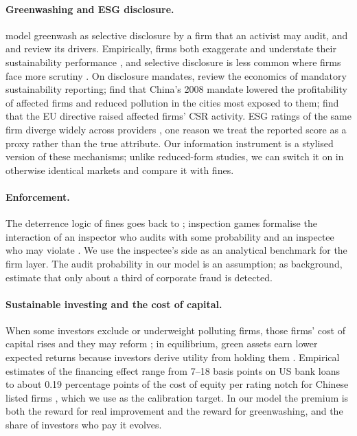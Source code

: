 \documentclass[11pt]{article}
\begin{document}
\paragraph{Greenwashing and ESG disclosure.} \citet{lyon2011greenwash} model greenwash as selective disclosure by a firm that an activist may audit, and \citet{delmas2011drivers} and \citet{lyon2015means} review its drivers. Empirically, firms both exaggerate and understate their sustainability performance \citep{kim2015greenwash}, and selective disclosure is less common where firms face more scrutiny \citep{marquis2016scrutiny}. On disclosure mandates, \citet{christensen2021mandatory} review the economics of mandatory sustainability reporting; \citet{chen2018effect} find that China's 2008 mandate lowered the profitability of affected firms and reduced pollution in the cities most exposed to them; \citet{fiechter2022real} find that the EU directive raised affected firms' CSR activity. ESG ratings of the same firm diverge widely across providers \citep{berg2022aggregate}, one reason we treat the reported score as a proxy rather than the true attribute. Our information instrument is a stylised version of these mechanisms; unlike reduced-form studies, we can switch it on in otherwise identical markets and compare it with fines.

\paragraph{Enforcement.} The deterrence logic of fines goes back to \citet{becker1968crime}; inspection games formalise the interaction of an inspector who audits with some probability and an inspectee who may violate \citep{avenhaus2002inspection}. We use the inspectee's side as an analytical benchmark for the firm layer. The audit probability in our model is an assumption; as background, \citet{dyck2024pervasive} estimate that only about a third of corporate fraud is detected.

\paragraph{Sustainable investing and the cost of capital.} When some investors exclude or underweight polluting firms, those firms' cost of capital rises and they may reform \citep{heinkel2001effect}; in equilibrium, green assets earn lower expected returns because investors derive utility from holding them \citep{pastor2021sustainable,pedersen2021responsible}. Empirical estimates of the financing effect range from 7--18 basis points on US bank loans \citep{goss2011impact} to about 0.19 percentage points of the cost of equity per rating notch for Chinese listed firms \citep{zhao2024esg}, which we use as the calibration target. In our model the premium is both the reward for real improvement and the reward for greenwashing, and the share of investors who pay it evolves.
\end{document}
